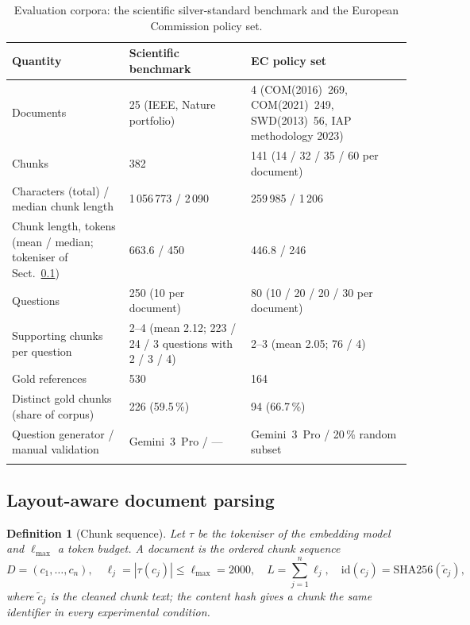\documentclass[pdflatex,sn-mathphys-num]{sn-jnl}
\theoremstyle{thmstyleone}%
\theoremstyle{thmstylethree}%
\newtheorem{definition}{Definition}%
\begin{document}
\begin{table}[tbp]
\caption{Evaluation corpora: the scientific silver-standard benchmark and the European Commission policy set.}\label{tab:corpora}
\begin{tabular}{@{}p{4.0cm}p{4.0cm}p{4.2cm}@{}}
\toprule
Quantity & Scientific benchmark & EC policy set \\
\midrule
Documents & 25 (IEEE, Nature portfolio) & 4 (COM(2016)~269, COM(2021)~249, SWD(2013)~56, IAP methodology 2023) \\
Chunks & 382 & 141 (14 / 32 / 35 / 60 per document) \\
Characters (total) / median chunk length & 1\,056\,773 / 2\,090 & 259\,985 / 1\,206 \\
Chunk length, tokens (mean / median; tokeniser of Sect.~\ref{sec:parsing}) & 663.6 / 450 & 446.8 / 246 \\
Questions & 250 (10 per document) & 80 (10 / 20 / 20 / 30 per document) \\
Supporting chunks per question & 2--4 (mean 2.12; 223 / 24 / 3 questions with 2 / 3 / 4) & 2--3 (mean 2.05; 76 / 4) \\
Gold references & 530 & 164 \\
Distinct gold chunks (share of corpus) & 226 (59.5\,\%) & 94 (66.7\,\%) \\
Question generator / manual validation & Gemini~3~Pro / --- & Gemini~3~Pro / 20\,\% random subset \\
\botrule
\end{tabular}
\end{table}

\subsection{Layout-aware document parsing}\label{sec:parsing}

\begin{definition}[Chunk sequence]\label{def:chunks}
Let $\tau$ be the tokeniser of the embedding model and $\ell_{\max}$ a token budget. A document is the ordered chunk sequence
\begin{equation}
D=(c_1,\dots,c_n),\quad \ell_j=|\tau(c_j)|\le \ell_{\max}=2000,\quad L=\sum_{j=1}^{n}\ell_j,\quad \mathrm{id}(c_j)=\mathrm{SHA256}(\tilde c_j),
\end{equation}
where $\tilde c_j$ is the cleaned chunk text; the content hash gives a chunk the same identifier in every experimental condition.
\end{definition}
\end{document}

